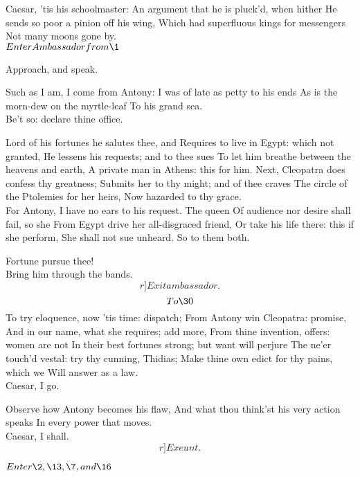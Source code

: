 \documentclass{book}
\begin{document}
	                  Caesar, 'tis his schoolmaster:
	An argument that he is pluck'd, when hither
	He sends so poor a pinion off his wing,
	Which had superfluous kings for messengers
	Not many moons gone by. \\

	\(Enter Ambassador from \1\)


\3	Approach, and speak.

	Such as I am, I come from Antony:
	I was of late as petty to his ends
	As is the morn-dew on the myrtle-leaf
	To his grand sea. \\

\3	                  Be't so: declare thine office.

	Lord of his fortunes he salutes thee, and
	Requires to live in Egypt: which not granted,
	He lessens his requests; and to thee sues
	To let him breathe between the heavens and earth,
	A private man in Athens: this for him.
	Next, Cleopatra does confess thy greatness;
	Submits her to thy might; and of thee craves
	The circle of the Ptolemies for her heirs,
	Now hazarded to thy grace. \\

\3	For Antony,
	I have no ears to his request. The queen
	Of audience nor desire shall fail, so she
	From Egypt drive her all-disgraced friend,
	Or take his life there: this if she perform,
	She shall not sue unheard. So to them both.

	Fortune pursue thee! \\

\3	Bring him through the bands. 	\[r]Exit ambassador.\]
	\[To \30\] 	To try eloquence, now 'tis time: dispatch;
	From Antony win Cleopatra: promise,
	And in our name, what she requires; add more,
	From thine invention, offers: women are not
	In their best fortunes strong; but want will perjure
	The ne'er touch'd vestal: try thy cunning, Thidias;
	Make thine own edict for thy pains, which we
	Will answer as a law. \\

	Caesar, I go.

\3	Observe how Antony becomes his flaw,
	And what thou think'st his very action speaks
	In every power that moves. \\

	Caesar, I shall.  	\[r]Exeunt.\]





	\(Enter \2, \13, \7, and \16\)
\end{document}
